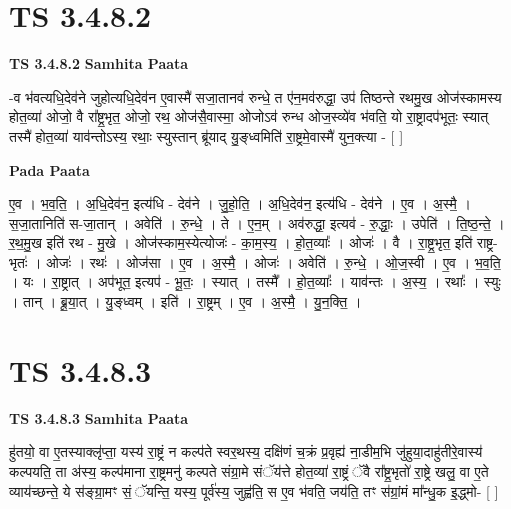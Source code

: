 \documentclass[17pt]{extarticle}
\begin{document}

\section{ TS 3.4.8.2 }

\textbf{TS 3.4.8.2 } \newline
\textbf{Samhita Paata} \newline

-व भ॑वत्यधि॒देव॑ने जुहोत्यधि॒देव॑न ए॒वास्मै॑ सजा॒तानव॑ रुन्धे॒ त ए॑न॒मव॑रुद्धा॒ उप॑ तिष्ठन्ते रथमु॒ख ओज॑स्कामस्य होत॒व्या॑ ओजो॒ वै रा᳚ष्ट्र॒भृत॒ ओजो॒ रथ॒ ओज॑सै॒वास्मा॒ ओजोऽव॑ रुन्ध ओज॒स्व्ये॑व भ॑वति॒ यो रा॒ष्ट्रादप॑भूतः॒ स्यात् तस्मै॑ होत॒व्या॑ याव॑न्तोऽस्य॒ रथाः॒ स्युस्तान् ब्रू॑याद् यु॒ङ्ध्वमिति॑ रा॒ष्ट्रमे॒वास्मै॑ युन॒क्त्या - [  ] \newline

\textbf{Pada Paata} \newline

ए॒व । भ॒व॒ति॒ । अ॒धि॒देव॑न॒ इत्य॑धि - देव॑ने । जु॒हो॒ति॒ । अ॒धि॒देव॑न॒ इत्य॑धि - देव॑ने । ए॒व । अ॒स्मै॒ । स॒जा॒तानिति॑ स-जा॒तान् । अवेति॑ । रु॒न्धे॒ । ते । ए॒न॒म् । अव॑रुद्धा॒ इत्यव॑ - रु॒द्धाः॒ । उपेति॑ । ति॒ष्ठ॒न्ते॒ । र॒थ॒मु॒ख इति॑ रथ - मु॒खे । ओज॑स्काम॒स्येत्योजः॑ - का॒म॒स्य॒ । हो॒त॒व्याः᳚ । ओजः॑ । वै । रा॒ष्ट्र॒भृत॒ इति॑ राष्ट्र-भृतः॑ । ओजः॑ । रथः॑ । ओज॑सा । ए॒व । अ॒स्मै॒ । ओजः॑ । अवेति॑ । रु॒न्धे॒ । ओ॒ज॒स्वी । ए॒व । भ॒व॒ति॒ । यः । रा॒ष्ट्रात् । अप॑भूत॒ इत्यप॑ - भू॒तः॒ । स्यात् । तस्मै᳚ । हो॒त॒व्याः᳚ । याव॑न्तः । अ॒स्य॒ । रथाः᳚ । स्युः । तान् । ब्रू॒या॒त् । यु॒ङ्ध्वम् । इति॑ । रा॒ष्ट्रम् । ए॒व । अ॒स्मै॒ । यु॒न॒क्ति॒ ।  \newline





\section{ TS 3.4.8.3 }

\textbf{TS 3.4.8.3 } \newline
\textbf{Samhita Paata} \newline

हु॑तयो॒ वा ए॒तस्याक्लृ॑प्ता॒ यस्य॑ रा॒ष्ट्रं न कल्प॑ते स्वर॒थस्य॒ दक्षि॑णं च॒क्रं प्र॒वृह्य॑ ना॒डीम॒भि जु॑हुया॒दाहु॑तीरे॒वास्य॑ कल्पयति॒ ता अ॑स्य॒ कल्प॑माना रा॒ष्ट्रमनु॑ कल्पते संग्रा॒मे संॅय॑त्ते होत॒व्या॑ रा॒ष्ट्रं ॅवै रा᳚ष्ट्र॒भृतो॑ रा॒ष्ट्रे खलु॒ वा ए॒ते व्याय॑च्छन्ते॒ ये स॑ङ्ग्रा॒मꣳ सं॒ ॅयन्ति॒ यस्य॒ पूर्व॑स्य॒ जुह्व॑ति॒ स ए॒व भ॑वति॒ जय॑ति॒ तꣳ स॑ग्रां॒मं मा᳚न्धु॒क इ॒द्ध्मो- [  ] \newline
\end{document}

